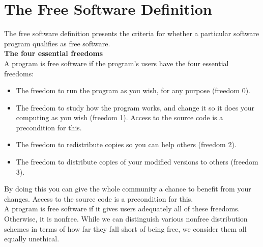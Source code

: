 \documentclass[6pt,a4paper]{report}
\begin{document}
\section*{The Free Software Definition}
The free software definition presents the criteria for whether a particular software 
program qualifies as free software. \\
\textbf{The four essential freedoms} \\
A program is free software if the program's users have the four essential freedoms:
\\
\begin{itemize}
\item The freedom to run the program as you wish, for any purpose (freedom 0).
\item The freedom to study how the program works, and change it so it does your 
computing as you wish (freedom 1). Access to the source code is a precondition for this.
\item The freedom to redistribute copies so you can help others (freedom 2).
\item The freedom to distribute copies of your modified versions to others (freedom 3). 
\end{itemize}
By doing this you can give the whole community a chance to benefit from your changes. 
Access to the source code is a precondition for this. \\
A program is free software if it gives users adequately all of these freedoms. Otherwise, 
it is nonfree. While we can distinguish various nonfree distribution schemes in terms of 
how far they fall short of being free, we consider them all equally unethical.
\end{document}
